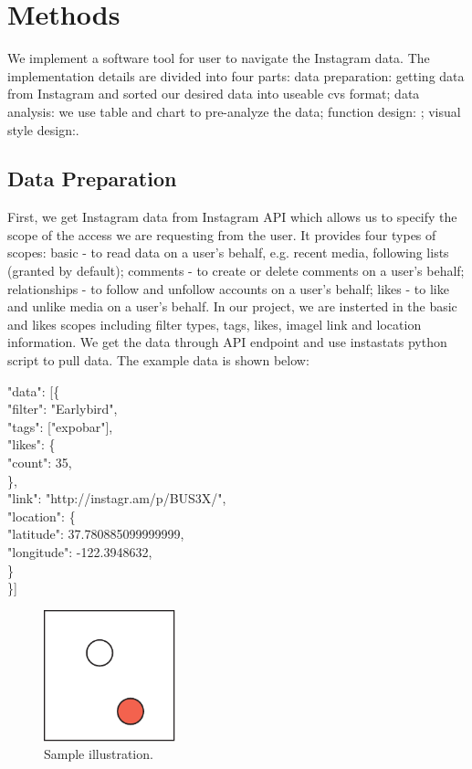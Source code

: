 \documentclass[conference]{acmsiggraph}
\begin{document}
\section{Methods}

We implement a software tool for user to navigate the Instagram data. The implementation details are divided into four parts: data preparation: getting data from Instagram and sorted our desired data into useable cvs format; data analysis: we use table and chart to pre-analyze the data; function design: ; visual style design:.

\subsection{Data Preparation}

First, we get Instagram data from Instagram API which allows us to specify the scope of the access we are requesting from the user. It provides four types of scopes: basic - to read data on a user’s behalf, e.g. recent media, following lists (granted by default); comments - to create or delete comments on a user’s behalf; relationships - to follow and unfollow accounts on a user’s behalf; likes - to like and unlike media on a user’s behalf. In our project, we are insterted in the basic and likes scopes including filter types, tags, likes, imagel link and location information. We get the data through API endpoint and use instastats python script to pull data. The example data is shown below:

"data": [\{\\
\text{\quad}        "filter": "Earlybird",\\
\text{\quad}        "tags": ["expobar"],\\
\text{\quad}        "likes": \{\\
\text{\quad \quad}              "count": 35,\\
\text{\quad}        \},\\
\text{\quad}        "link": "http://instagr.am/p/BUS3X/",\\
\text{\quad}        "location": \{\\
\text{\quad \quad}            "latitude": 37.780885099999999,\\
\text{\quad \quad}            "longitude": -122.3948632,\\
\text{\quad}        \}\\
    \}]

\begin{figure}[ht]
  \centering
  \includegraphics[width=1.5in]{images/samplefigure}
  \caption{Sample illustration.}
\end{figure}
\end{document}

